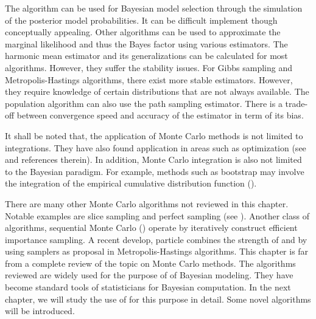 The \rjmcmc algorithm can be used for Bayesian model selection through the
simulation of the posterior model probabilities. It can be difficult implement
though conceptually appealing. Other algorithms can be used to approximate the
marginal likelihood and thus the Bayes factor using various estimators. The
harmonic mean estimator and its generalizations can be calculated for most
\mcmc algorithms. However, they suffer the stability issues. For Gibbs
sampling and Metropolis-Hastings algorithms, there exist more stable
estimators. However, they require knowledge of certain distributions that are
not always available. The population \mcmc algorithm can also use the path
sampling estimator. There is a trade-off between convergence speed and
accuracy of the estimator in term of its bias.

It shall be noted that, the application of Monte Carlo methods is not limited
to integrations. They have also found application in areas such as
optimization (see \cite[][chap.~5]{Robert:2004tn} and references therein). In
addition, Monte Carlo integration is also not limited to the Bayesian
paradigm. For example, methods such as bootstrap may involve the integration
of the empirical cumulative distribution function (\cdf).

There are many other Monte Carlo algorithms not reviewed in this chapter.
Notable examples are slice sampling and perfect sampling (see \cite[][chap.~8
and~13]{Robert:2004tn}). Another class of algorithms, sequential Monte Carlo
(\smc) operate by iteratively construct efficient importance sampling. A
recent develop, particle \mcmc \cite{Andrieu:2010gc} combines the strength of
\mcmc and \smc by using \smc samplers as proposal in Metropolis-Hastings
algorithms. This chapter is far from a complete review of the topic on Monte
Carlo methods. The algorithms reviewed are widely used for the purpose of of
Bayesian modeling. They have become standard tools of statisticians for
Bayesian computation. In the next chapter, we will study the use of \smc for
this purpose in detail. Some novel algorithms will be introduced.
